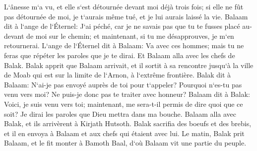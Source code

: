 \verse L`ânesse m`a vu, et elle s`est détournée devant moi déjà trois fois; si elle ne fût pas détournée de moi, je t`aurais même tué, et je lui aurais laissé la vie. 
\verse Balaam dit à l`ange de l`Éternel: J`ai péché, car je ne savais pas que tu te fusses placé au-devant de moi sur le chemin; et maintenant, si tu me désapprouves, je m`en retournerai. 
\verse L`ange de l`Éternel dit à Balaam: Va avec ces hommes; mais tu ne feras que répéter les paroles que je te dirai. Et Balaam alla avec les chefs de Balak. 
\verse Balak apprit que Balaam arrivait, et il sortit à sa rencontre jusqu`à la ville de Moab qui est sur la limite de l`Arnon, à l`extrême frontière. 
\verse Balak dit à Balaam: N`ai-je pas envoyé auprès de toi pour t`appeler? Pourquoi n`es-tu pas venu vers moi? Ne puis-je donc pas te traiter avec honneur? 
\verse Balaam dit à Balak: Voici, je suis venu vers toi; maintenant, me sera-t-il permis de dire quoi que ce soit? Je dirai les paroles que Dieu mettra dans ma bouche. 
\verse Balaam alla avec Balak, et ils arrivèrent à Kirjath Hutsoth. 
\verse Balak sacrifia des boeufs et des brebis, et il en envoya à Balaam et aux chefs qui étaient avec lui. 
\verse Le matin, Balak prit Balaam, et le fit monter à Bamoth Baal, d`où Balaam vit une partie du peuple. 

\chapter{}

